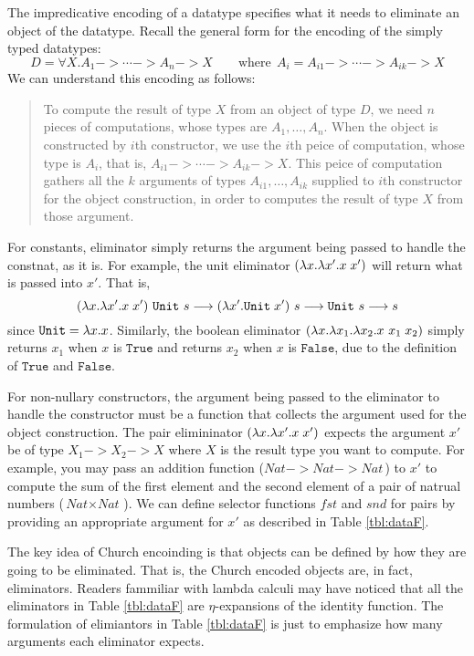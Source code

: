 The impredicative encoding of a datatype specifies what it needs to eliminate
an object of the datatype. Recall the general form for the encoding of
the simply typed datatypes:
\[D = \forall X. A_1 -> \cdots -> A_n -> X
	\qquad\text{where}~~ A_i = A_{i1} -> \cdots -> A_{ik} -> X \]
We can understand this encoding as follows:
\begin{quote}
To compute the result of type $X$ from an object of type $D$,
we need $n$ pieces of computations, whose types are $A_1,\dots,A_n$.
When the object is constructed by $i$th constructor, we use the $i$th peice of
computation, whose type is $A_i$, that is, $A_{i1} -> \cdots -> A_{ik} -> X$.
This peice of computation gathers all the $k$ arguments of types
$A_{i1},\dots,A_{ik}$ supplied to $i$th constructor for the object construction,
in order to computes the result of type $X$ from those argument.
\end{quote}

For constants, eliminator simply returns the argument being passed to handle
the constnat, as it is. For example, the unit eliminator
$(\lambda x .\lambda x'.x\;x')$ will return what is passed into $x'$. That is,
\[   (\lambda x .\lambda x'.x\;x')~\mathtt{Unit}~s
 --> (\lambda x'.\mathtt{Unit}\;x')~s
 --> \mathtt{Unit}~s
 --> s
\] since $\texttt{Unit}=\lambda x.x$.
Similarly, the boolean eliminator $(\lambda x.\lambda x_1.\lambda x_2.x~x_1\;x_2)$
simply returns $x_1$ when $x$ is $\mathtt{True}$
and returns $x_2$ when $x$ is $\mathtt{False}$,
due to the definition of $\mathtt{True}$ and $\mathtt{False}$.

For non-nullary constructors, the argument being passed to the eliminator
to handle the constructor must be a function that collects the argument used
for the object construction. The pair elimininator $(\lambda x.\lambda x'.x\;x')$ expects
the argument $x'$ be of type $X_1 -> X_2 -> X$ where $X$ is the result type
you want to compute. For example, you may pass an addition function 
($\textit{Nat} -> \textit{Nat} -> \textit{Nat}\,$) to $x'$ to compute
the sum of the first element and the second element of a pair of
natrual numbers ($\textit{Nat}\times\textit{Nat}\,$). We can define
selector functions $fst$ and $snd$ for pairs by providing an appropriate
argument for $x'$ as described in Table \ref{tbl:dataF}.

The key idea of Church encoinding is that objects can be defined by
how they are going to be eliminated. That is, the Church encoded objects
are, in fact, eliminators. Readers fammiliar with lambda calculi may have
noticed that all the eliminators in Table \ref{tbl:dataF} are
$\eta$-expansions of the identity function. The formulation of elimiantors
in Table \ref{tbl:dataF} is just to emphasize how many arguments
each eliminator expects.

